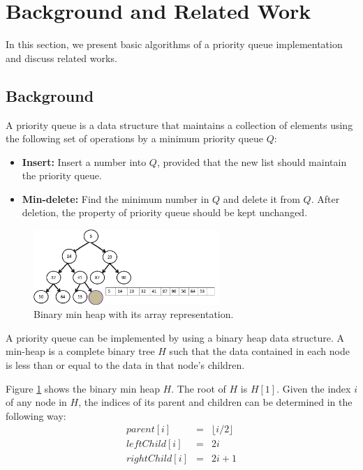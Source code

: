 \documentclass[10pt, conference, compsocconf]{IEEEtran}
\newtheorem{definition}{Definition}[section]
\begin{document}
\section{Background and Related Work}
In this section, we present basic algorithms of a priority queue implementation and discuss related works.

\subsection{Background}
A priority queue is a data structure that maintains a collection of elements using the following set of
operations by a minimum priority queue $Q$:
\begin{itemize}
\item {\bf Insert:} Insert a number into $Q$, provided that the new list should maintain the priority queue.

\item {\bf Min-delete:} Find the minimum number in $Q$ and delete it from $Q$. After deletion, the property of priority queue should be kept unchanged.
\end{itemize}


\begin{figure}[!ht]
  \centering
  \includegraphics[width=7cm]{Figures/fig2.png}
      \caption{Binary min heap with its array representation.}
    \label{fig2}
\end{figure}

A priority queue can be implemented by using a binary heap data structure.
A min-heap is a complete binary tree $H$ such that the data contained in each node is less than or equal to the data in that node's children.

Figure \ref{fig2} shows the binary min heap $H$. The root of $H$ is $H[1]$. Given the index $i$ of any node in $H$, the indices of its parent and children can be determined in the following way:
\begin{eqnarray*}
parent[i] &=&  \lfloor i/2 \rfloor \\
leftChild[i] &=& 2i\\
rightChild[i] &=& 2i + 1
\end{eqnarray*}
\end{document}
